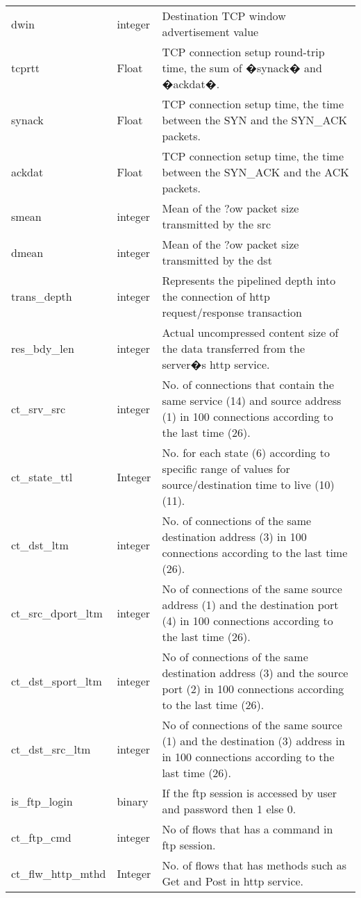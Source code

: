 \begin{longtable}{@{}p{}p{}p{}@{}}
dwin & integer & Destination TCP window advertisement value \\
tcprtt & Float & TCP connection setup round-trip time, the sum of �synack� and �ackdat�. \\
synack & Float & TCP connection setup time, the time between the SYN and the SYN\_ACK packets. \\
ackdat & Float & TCP connection setup time, the time between the SYN\_ACK and the ACK packets. \\
smean & integer & Mean of the ?ow packet size transmitted by the src \\
dmean & integer & Mean of the ?ow packet size transmitted by the dst \\
trans\_depth & integer & Represents the pipelined depth into the connection of http request/response transaction \\
res\_bdy\_len & integer & Actual uncompressed content size of the data transferred from the server�s http service. \\
ct\_srv\_src & integer & No. of connections that contain the same service (14) and source address (1) in 100 connections according to the last time (26). \\
ct\_state\_ttl & Integer & No. for each state (6) according to specific range of values for source/destination time to live (10) (11). \\
ct\_dst\_ltm & integer & No. of connections of the same destination address (3) in 100 connections according to the last time (26). \\
ct\_src\_dport\_ltm & integer & No of connections of the same source address (1) and the destination port (4) in 100 connections according to the last time (26). \\
ct\_dst\_sport\_ltm & integer & No of connections of the same destination address (3) and the source port (2) in 100 connections according to the last time (26). \\
ct\_dst\_src\_ltm & integer & No of connections of the same source (1) and the destination (3) address in in 100 connections according to the last time (26). \\
is\_ftp\_login & binary & If the ftp session is accessed by user and password then 1 else 0. \\
ct\_ftp\_cmd & integer & No of flows that has a command in ftp session. \\
ct\_flw\_http\_mthd & Integer & No. of flows that has methods such as Get and Post in http service. \\

\end{longtable}
